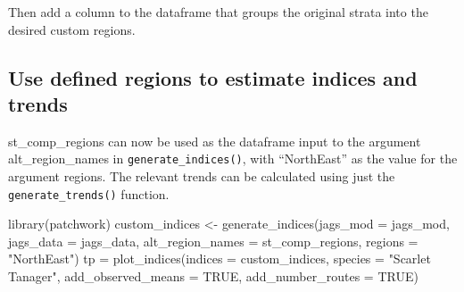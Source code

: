 \documentclass[
]{book}
\newenvironment{Shaded}{\begin{snugshade}}{\end{snugshade}}
\newcommand{\AttributeTok}[1]{\textcolor[rgb]{0.77,0.63,0.00}{#1}}
\newcommand{\ConstantTok}[1]{\textcolor[rgb]{0.00,0.00,0.00}{#1}}
\newcommand{\DecValTok}[1]{\textcolor[rgb]{0.00,0.00,0.81}{#1}}
\newcommand{\FunctionTok}[1]{\textcolor[rgb]{0.00,0.00,0.00}{#1}}
\newcommand{\NormalTok}[1]{#1}
\newcommand{\OtherTok}[1]{\textcolor[rgb]{0.56,0.35,0.01}{#1}}
\newcommand{\SpecialCharTok}[1]{\textcolor[rgb]{0.00,0.00,0.00}{#1}}
\newcommand{\StringTok}[1]{\textcolor[rgb]{0.31,0.60,0.02}{#1}}
\begin{document}
Then add a column to the dataframe that groups the original strata into the desired custom regions.

\begin{Shaded}
\end{Shaded}

\hypertarget{use-defined-regions-to-estimate-indices-and-trends}{%
\subsection{Use defined regions to estimate indices and trends}\label{use-defined-regions-to-estimate-indices-and-trends}}

st\_comp\_regions can now be used as the dataframe input to the argument alt\_region\_names in \texttt{generate\_indices()}, with ``NorthEast'' as the value for the argument regions. The relevant trends can be calculated using just the \texttt{generate\_trends()} function.

\begin{Shaded}
\begin{Highlighting}[]
\FunctionTok{library}\NormalTok{(patchwork)}
\NormalTok{custom\_indices }\OtherTok{\textless{}{-}} \FunctionTok{generate\_indices}\NormalTok{(}\AttributeTok{jags\_mod =}\NormalTok{ jags\_mod,}
                                      \AttributeTok{jags\_data =}\NormalTok{ jags\_data,}
                                      \AttributeTok{alt\_region\_names =}\NormalTok{ st\_comp\_regions,}
                                      \AttributeTok{regions =} \StringTok{"NorthEast"}\NormalTok{)}
\NormalTok{tp }\OtherTok{=} \FunctionTok{plot\_indices}\NormalTok{(}\AttributeTok{indices =}\NormalTok{ custom\_indices,}
                         \AttributeTok{species =} \StringTok{"Scarlet Tanager"}\NormalTok{,}
                  \AttributeTok{add\_observed\_means =} \ConstantTok{TRUE}\NormalTok{,}
                  \AttributeTok{add\_number\_routes =} \ConstantTok{TRUE}\NormalTok{)}
\end{Highlighting}
\end{Shaded}
\end{document}
